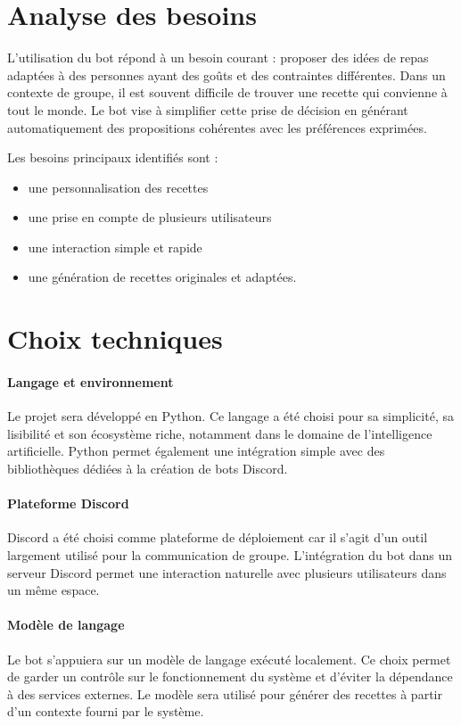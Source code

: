 \documentclass[12pt]{article}
\begin{document}
    \section{Analyse des besoins}

        L’utilisation du bot répond à un besoin courant : proposer des idées de repas adaptées à des personnes ayant des goûts et des contraintes différentes.
        Dans un contexte de groupe, il est souvent difficile de trouver une recette qui convienne à tout le monde.
        Le bot vise à simplifier cette prise de décision en générant automatiquement des propositions cohérentes avec les préférences exprimées.

        Les besoins principaux identifiés sont :
        \begin{itemize}
            \item une personnalisation des recettes 
            \item une prise en compte de plusieurs utilisateurs 
            \item une interaction simple et rapide 
            \item une génération de recettes originales et adaptées.
        \end{itemize}
 
    \section{Choix techniques}

        \paragraph{Langage et environnement}
            Le projet sera développé en Python.
            Ce langage a été choisi pour sa simplicité, sa lisibilité et son écosystème riche, notamment dans le domaine de l’intelligence artificielle.
            Python permet également une intégration simple avec des bibliothèques dédiées à la création de bots Discord.
        \paragraph{Plateforme Discord}
            Discord a été choisi comme plateforme de déploiement car il s’agit d’un outil largement utilisé pour la communication de groupe.
            L’intégration du bot dans un serveur Discord permet une interaction naturelle avec plusieurs utilisateurs dans un même espace.

        \paragraph{Modèle de langage}
            Le bot s’appuiera sur un modèle de langage exécuté localement.
            Ce choix permet de garder un contrôle sur le fonctionnement du système et d’éviter la dépendance à des services externes.
            Le modèle sera utilisé pour générer des recettes à partir d’un contexte fourni par le système.
     
\end{document}
